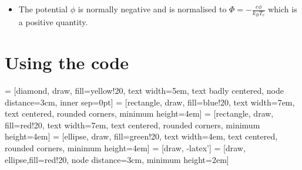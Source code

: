 \documentclass{journal}
\begin{document}
\begin{itemize}
    \item The potential $\phi$ is normally negative and is normalised to $\Phi = -\frac{e\phi}{k_B T_e}$ which is a positive quantity.
\end{itemize}

\section{Using the code}

\medskip

 = [diamond, draw, fill=yellow!20, 
    text width=5em, text badly centered, node distance=3cm, inner sep=0pt]
 = [rectangle, draw, fill=blue!20, 
    text width=7em, text centered, rounded corners, minimum height=4em]
 = [rectangle, draw, fill=red!20, 
    text width=7em, text centered, rounded corners, minimum height=4em]
 = [ellipse, draw, fill=green!20, 
    text width=4em, text centered, rounded corners, minimum height=4em]
 = [draw, -latex']
 = [draw, ellipse,fill=red!20, node distance=3cm,
    minimum height=2em]
    
\end{document}
